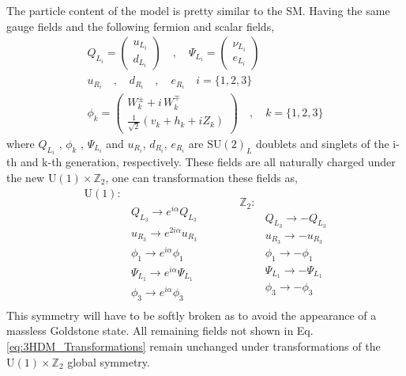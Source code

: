 The particle content of the model is pretty similar to the SM. Having the same gauge fields and the following fermion and scalar fields,
\begin{equation}
\begin{split}
Q_{L_i} =  \begin{pmatrix}
u_{L_i}  \\
d_{L_i}
\end{pmatrix} \quad , \quad \Psi_{L_i} =  \begin{pmatrix}
\nu_{L_i}  \\
e_{L_i}
\end{pmatrix} \\  
u_{R_i} \quad , \quad d_{R_i} \quad , \quad e_{R_i} \quad i=\{1,2,3\} \\ 
\phi_k = \begin{pmatrix}
W_k^\pm + i \, W_k^\mp \\ 
\frac{1}{\sqrt{2}}\left( v_k + h_k + i Z_k \right) 
\end{pmatrix}  \quad , \quad k=\{ 1,2,3\} 
\end{split} 
\end{equation}
where $Q_{L_i}$ , $\phi_k$ , $\Psi_{L_i}$ and $u_{R_i}$, $d_{R_i}$, $e_{R_i}$ are $\mathrm{SU}(2)_L$ doublets and singlets of the i-th and k-th
generation, respectively. These fields are all naturally charged under the new $\mathrm{U(1)}\times\mathbb{Z}_2$, one can transformation these fields as, 
\begin{equation}
\label{eq:3HDM_Transformations}
	\begin{split} 
	\mathrm{U(1)} : & \\
		& Q_{L_3} \rightarrow    e^{i \alpha} Q_{L_3}  \\  
		& u_{R_3} \rightarrow    e^{2 i \alpha} u_{R_3}  \\
		& \phi_1  \rightarrow    e^{i \alpha} \phi_1  \\   
		& \Psi_{L_1} \rightarrow e^{i \alpha} \Psi_{L_1} \\
		& \phi_3 \rightarrow     e^{i \alpha} \phi_3  \\ 
	\end{split} \quad \quad \quad  
	\begin{split}
		\mathbb{Z}_2 : & \\
		 	& Q_{L_3} \rightarrow -Q_{L_3} \\
		 	& u_{R_3} \rightarrow -u_{R_3} \\ 
		 	& \phi_1  \rightarrow -\phi_1 \\ 
		 	& \Psi_{L_1} \rightarrow - \Psi_{L_1} \\ 
		 	& \phi_3 \rightarrow -\phi_3
	\end{split} 
\end{equation} 
%
This symmetry will have to be softly broken as to avoid the appearance of a massless Goldstone state. All remaining fields not shown in Eq. \ref{eq:3HDM_Transformations} remain unchanged under transformations of the $\mathrm{U(1)}\times\mathbb{Z}_2$ global symmetry. 
